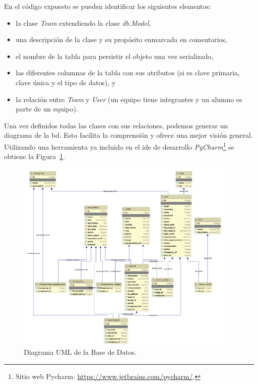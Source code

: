 \documentclass[11pt,spanish,listoffigures,listoftables]{tfgetsinf}
\begin{document}
En el código expuesto se pueden identificar los siguientes elementos:

\begin{itemize}
	\item la clase \textit{Team} extendiendo la clase \textit{db.Model},
	\item una descripción de la clase y su propósito enmarcada en comentarios,
	\item el nombre de la tabla para persistir el objeto una vez serializado,
	\item las diferentes columnas de la tabla con sus atributos (si es clave primaria, clave única y el tipo de datos), y
    \item la relación entre \textit{Team} y \textit{User} (un \gls{equipo} tiene integrantes y un \gls{alumno} es parte de un \gls{equipo}).
\end{itemize}

Una vez definidos todas las clases con sus relaciones, podemos generar un diagrama de la \Gls{bd}. Esto facilita la comprensión y ofrece una mejor visión general. Utilizando una herramienta ya incluida en el \acrshort{ide} de desarrollo \textit{PyCharm}\footnote{Sitio web Pycharm: \url{https://www.jetbrains.com/pycharm/}.} se obtiene la Figura~\ref{figura:database-uml-diagram}.

\begin{figure}[!ht]
	\centering
	\includegraphics[width=0.95\textwidth]{img/database-uml-diagram}
    \caption[Diagrama UML de la Base de Datos]{Diagrama UML de la Base de Datos.}
	\label{figura:database-uml-diagram}
\end{figure}
\end{document}
